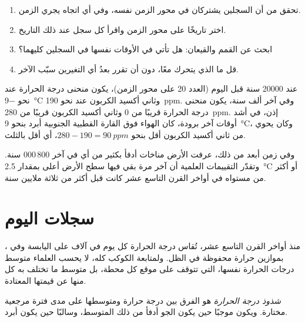 \begin{method}
\begin{enumerate}
  \item تحقق من أن السجلين يشتركان في محور الزمن نفسه، وفي أي اتجاه
        يجري الزمن.
  \item اختر تاريخًا على محور الزمن واقرأ كل سجل عند ذلك التاريخ.
  \item ابحث عن القمم والقيعان: هل تأتي في الأوقات نفسها في السجلين
        كليهما؟
  \item قل ما الذي يتحرك معًا، دون أن تقرر بعدُ أي التغيرين سبّب
        الآخر.
\end{enumerate}
\end{method}

\begin{example}
عند \num{20000} سنة قبل اليوم (العدد 20 على محور الزمن)، يكون منحنى درجة
الحرارة عند نحو \qty{-9}{\degreeCelsius} وثاني أكسيد الكربون عند نحو
\qty{190}{ppm}. وفي آخر ألف سنة، يكون منحنى درجة الحرارة قريبًا من 0 وثاني أكسيد
الكربون قريبًا من \qty{280}{ppm}. إذن، في أشد أوقات آخر  برودة، كان
الهواء فوق القارة القطبية الجنوبية أبرد بنحو \qty{9}{\degreeCelsius}، وكان يحوي
من ثاني أكسيد الكربون أقل بنحو $280 - 190 = \qty{90}{ppm}$، أي أقل بالثلث.
\end{example}

وفي زمن أبعد من ذلك، عرفت الأرض مناخات أدفأ بكثير من أي  في آخر
800\,000 سنة. وتقدّر التقييمات العلمية أن آخر مرة بقي فيها سطح الأرض أعلى بمقدار
\qty{2.5}{\degreeCelsius} أو أكثر من مستواه في أواخر القرن التاسع عشر كانت قبل
أكثر من ثلاثة ملايين سنة.

\section{سجلات اليوم}

منذ أواخر القرن التاسع عشر، تُقاس درجة الحرارة كل يوم في آلاف  على
اليابسة وفي ، بموازين حرارة محفوظة في الظل. ولمتابعة الكوكب كله، لا يحسب
العلماء متوسط درجات الحرارة نفسها، التي تتوقف على موقع كل محطة، بل متوسط ما
تختلف به كل منها عن قيمتها المعتادة.

\begin{definition}\label{def:g9:climate-past-and-present:anomaly}
\emph{شذوذ درجة الحرارة} هو الفرق بين درجة حرارة
ومتوسطها على مدى فترة مرجعية مختارة. ويكون موجبًا حين يكون الجو أدفأ من ذلك
المتوسط، وسالبًا حين يكون أبرد.
\end{definition}

